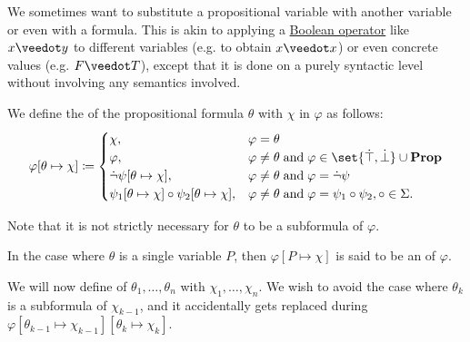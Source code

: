 \begin{definition}\label{def:propositional_substitution}
  We sometimes want to substitute a propositional variable with another variable or even with a formula. This is akin to applying a \hyperref[def:boolean_operator]{Boolean operator} like \( x \synvee y \) to different variables (e.g. to obtain \( x \synvee x \)) or even concrete values (e.g. \( F \synvee T \)), except that it is done on a purely syntactic level without involving any semantics involved.

  \begin{thmenum}
     We define the  of the propositional formula \( \theta \) with \( \chi \) in \( \varphi \) as follows:
    \begin{equation}\label{eq:def:propositional_substitution/single}
      \varphi[\theta \mapsto \chi] \coloneqq \begin{cases}
        \chi,                                                             &\varphi = \theta \\
        \varphi,                                                          &\varphi \neq \theta \T{and} \varphi \in \set{ \syntop, \synbot } \cup \boldop{Prop} \\
        \synneg \psi[\theta \mapsto \chi],                                   &\varphi \neq \theta \T{and} \varphi = \synneg \psi \\
        \psi_1[\theta \mapsto \chi] \bincirc \psi_2[\theta \mapsto \chi], &\varphi \neq \theta \T{and} \varphi = \psi_1 \bincirc \psi_2, \circ \in \Sigma.
      \end{cases}
    \end{equation}

    Note that it is not strictly necessary for \( \theta \) to be a subformula of \( \varphi \).

    In the case where \( \theta \) is a single variable \( P \), then \( \varphi[P \mapsto \chi] \) is said to be an  of \( \varphi \).

     We will now define  of \( \theta_1, \ldots, \theta_n \) with \( \chi_1, \ldots, \chi_n \). We wish to avoid the case where \( \theta_k \) is a subformula of \( \chi_{k-1} \), and it accidentally gets replaced during \( \varphi[\theta_{k-1} \mapsto \chi_{k-1}][\theta_k \mapsto \chi_k] \).


\end{thmenum}
\end{definition}
